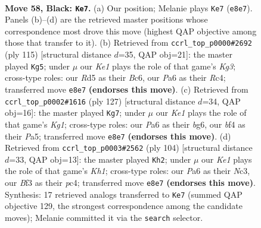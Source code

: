 \documentclass[11pt]{article}
\begin{document}
\clearpage

\begin{figure}[p]\centering
\begin{subfigure}{0.46\textwidth}\centering
\resizebox{\linewidth}{!}{%
\newchessgame
\chessboard[
  setfen={4k1K1/n1P5/p7/P2r1p1p/4pB2/5bP1/8/RN6 b - - 23 58},
  showmover=false,
  pgfstyle=straightmove, color=movearrow, markmove={e8-e7}
]}
\caption{}
\end{subfigure}\hfill
\begin{subfigure}{0.46\textwidth}\centering
\resizebox{\linewidth}{!}{%
\newchessgame
\chessboard[
  setfen={8/1p6/p1b3k1/4B3/2r4p/P4P2/1P1R1K1P/8 b - - 26 58},
  showmover=false,
  pgfstyle=straightmove, color=movearrow, markmove={g6-g5}
]}
\caption{}
\end{subfigure}
\\[4pt]
\begin{subfigure}{0.46\textwidth}\centering
\resizebox{\linewidth}{!}{%
\newchessgame
\chessboard[
  setfen={6k1/8/1p4B1/p1p1p3/P1PbP3/5RP1/KP6/7r b - - 14 64},
  showmover=false,
  pgfstyle=straightmove, color=movearrow, markmove={g8-g7}
]}
\caption{}
\end{subfigure}\hfill
\begin{subfigure}{0.46\textwidth}\centering
\resizebox{\linewidth}{!}{%
\newchessgame
\chessboard[
  setfen={1n6/1B3bk1/4r1p1/P6p/2p5/2N4P/6P1/5R1K w - - 4 53},
  showmover=false,
  pgfstyle=straightmove, color=movearrow, markmove={h1-h2}
]}
\caption{}
\end{subfigure}
\caption{\textbf{Move 58, Black: \texttt{Ke7}.} (a) Our position; Melanie plays \texttt{Ke7} (\texttt{e8e7}). Panels (b)--(d) are the retrieved master positions whose correspondence most drove this move (highest QAP objective among those that transfer to it). (b) Retrieved from \texttt{ccrl\_top\_p0000\#2692} (ply 115) [structural distance $d$=35, QAP obj=21]: the master played \texttt{Kg5}; under $\mu$ our \emph{Ke1} plays the role of that game's \emph{Kg3}; cross-type roles: our \emph{R}d5 as their \emph{B}c6, our \emph{P}a6 as their \emph{R}c4; transferred move \texttt{e8e7} \textbf{(endorses this move)}. (c) Retrieved from \texttt{ccrl\_top\_p0002\#1616} (ply 127) [structural distance $d$=34, QAP obj=16]: the master played \texttt{Kg7}; under $\mu$ our \emph{Ke1} plays the role of that game's \emph{Kg1}; cross-type roles: our \emph{P}a6 as their \emph{b}g6, our \emph{b}f4 as their \emph{P}a5; transferred move \texttt{e8e7} \textbf{(endorses this move)}. (d) Retrieved from \texttt{ccrl\_top\_p0003\#2562} (ply 104) [structural distance $d$=33, QAP obj=13]: the master played \texttt{Kh2}; under $\mu$ our \emph{Ke1} plays the role of that game's \emph{Kh1}; cross-type roles: our \emph{P}a6 as their \emph{N}c3, our \emph{B}f3 as their \emph{p}c4; transferred move \texttt{e8e7} \textbf{(endorses this move)}. Synthesis: 17 retrieved analogs transferred to \texttt{Ke7} (summed QAP objective 129, the strongest correspondence among the candidate moves); Melanie committed it via the \texttt{search} selector.}
\label{fig:thought-m115}
\end{figure}
\end{document}
